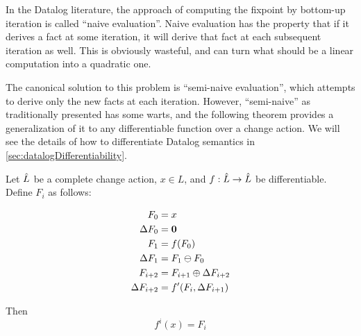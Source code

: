 In the Datalog literature, the approach of computing the fixpoint by bottom-up
iteration is called ``naive evaluation''. Naive evaluation has the property that
if it derives a fact at some iteration, it will derive that fact at each
subsequent iteration as well. This is obviously wasteful, and can turn what
should be a linear computation into a quadratic one.

The canonical solution to this problem is ``semi-naive evaluation'', which
attempts to derive only the new facts at each iteration. However, ``semi-naive''
as traditionally presented has some warts, and
the following theorem provides a generalization of it to any differentiable function over a
change action. We will see the details of how to differentiate Datalog
semantics in \cref{sec:datalogDifferentiability}.


\begin{thm}
\label{thm:diffIter}
  Let $\hat{L}$ be a complete change action, $x \in L$, and $f: \hat{L} \rightarrow \hat{L}$ be differentiable. Define $F_i$ as follows:

  \begin{align*}
  F_0 &= x\\
  \Delta F_0 &= \textbf{0} \\
  F_1 &= f(F_0)\\
  \Delta F_1 &= F_1 \ominus F_0 \\
  F_{i+2} &= F_{i+1} \oplus \Delta F_{i+2} \\
  \Delta F_{i+2} &= f'(F_i, \Delta F_{i+1}) \\
  \end{align*}

  Then
  $$f^i(x) = F_i$$
\end{thm}

